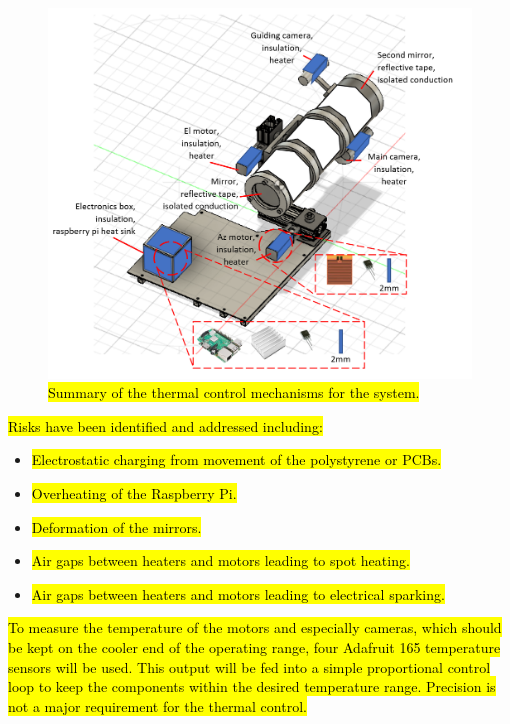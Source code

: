 \begin{figure}[H]
\centering
\includegraphics[scale=0.8]{4-experiment-design/img/mechanical/thermalsolutions.png}
\caption{\hl{Summary of the thermal control mechanisms for the system.}}
\label{fig:thermalsolutions}
\end{figure}

\hl{Risks have been identified and addressed including:}

\begin{itemize}
  \item \hl{Electrostatic charging from movement of the polystyrene or PCBs.}
  \item \hl{Overheating of the Raspberry Pi.}
  \item \hl{Deformation of the mirrors.} 
  \item \hl{Air gaps between heaters and motors leading to spot heating.} 
  \item \hl{Air gaps between heaters and motors leading to electrical sparking.}

\end{itemize}

\hl{To measure the temperature of the motors and especially cameras, which should be kept on the cooler end of the operating range, four Adafruit 165 temperature sensors will be used. This output will be fed into a simple proportional control loop to keep the components within the desired temperature range. Precision is not a major requirement for the thermal control.}

